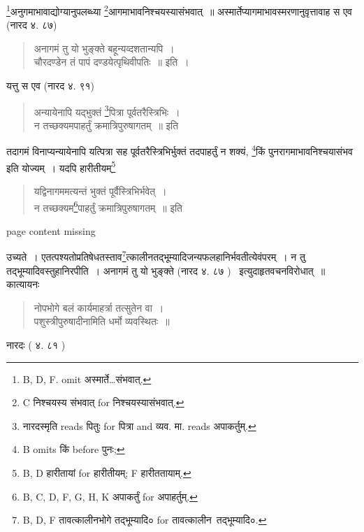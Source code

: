 \documentclass[11pt, openany]{book}
\begin{document}
\renewcommand{\thefootnote}{3}\footnote{B, D, F. omit अस्मार्ते\ldots संभवात्.}अनुगमाभावाद्योग्यानुपलब्ध्या \renewcommand{\thefootnote}{4}\footnote{C निश्चयस्य संभवात् for निश्चयस्यासंभवात्.}आगमाभावनिश्चयस्यासंभवात्~॥ अस्मार्तेप्यागमाभावस्मरणानुवृत्तावाह स एव (नारद ४. ८७)

\begin{quote}
{\vy अनागमं तु यो भुङ्क्ते बहून्यव्दशतान्यपि~।\\
चौरदण्डेन तं पापं दण्डयेत्पृथिवीपतिः~॥} इति~।
\end{quote}

यत्तु स एव (नारद ४. ९१)

\begin{quote}
{\vy अन्यायेनापि यद्भुक्तं \renewcommand{\thefootnote}{5}\footnote{नारदस्मृति reads पितुः for पित्रा and व्यव. मा. reads अपाकर्तुम्.}पित्रा पूर्वतरैस्त्रिभिः~।\\
न तच्छक्यमपाहर्तुं क्रमात्रिपुरुषागतम्~॥} इति
\end{quote}

तदागमं विनाप्यन्यायेनापि यत्पित्रा सह पूर्वतरैस्त्रिभिर्भुक्तं तदपाहर्तुं न शक्यं, \renewcommand{\thefootnote}{6}\footnote{B omits किं before पुनः;}किं पुनरागमाभावनिश्चयासंभव इति योज्यम्~। यदपि हारीतीयम्\renewcommand{\thefootnote}{7}\footnote{B, D हारीतायां for हारीतीयम्; F हारीततायाम्.}

\begin{quote}
{\vy यद्विनागममत्यन्तं भुक्तं पूर्वैस्त्रिभिर्भवेत्~।\\
न तच्छक्यम\renewcommand{\thefootnote}{8}\footnote{B, C, D, F, G, H, K अपाकर्तुं for अपाहर्तुम्.}पाहर्तुं क्रमात्रिपुरुषागतम्~॥} इति
\end{quote}

\newpage
page content missing

\newpage
{}

\noindent
उच्यते~। एतत्पश्यतोप्रतिषेधतस्ताव\renewcommand{\thefootnote}{1}\footnote{B, D, F तावत्कालीनभोगे तद्भूम्यादि० for तावत्कालीन\textendash\ तद्भूम्यादि०.}त्कालीनतद्भूम्यादिजन्यफलहानिर्भवतीत्येवंपरम्~। न तु तद्भूम्यादिवस्तुहानिरपीति~। अनागमं तु यो भुङ्क्ते (नारद ४. ८७ ) \textendash\ इत्युदाहृतवचनविरोधात्~॥ कात्यायनः 

\begin{quote}
{\vy नोपभोगे बलं कार्यमाहर्त्रा तत्सुतेन वा~।\\
पशुस्त्रीपुरुषादीनामिति धर्मो व्यवस्थितः~॥}
\end{quote}

नारदः ( ४. ८१ ) 
\end{document}
